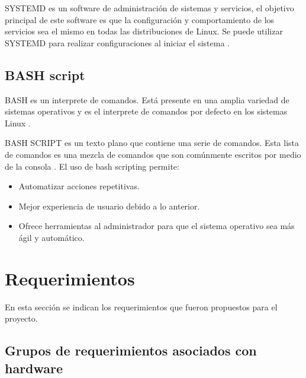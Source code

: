 SYSTEMD es un software de administración de sistemas y servicios, el objetivo principal de este software es que la configuración y comportamiento de los servicios sea el mismo en todas las distribuciones de Linux. Se puede utilizar SYSTEMD para realizar configuraciones al iniciar el sistema \citep{REFSYSTEMD}.

\subsection{BASH script}
BASH es un interprete de comandos. Está presente en una amplia variedad de sistemas operativos y es el interprete de comandos por defecto en los sistemas Linux \citep{BASH}. 


BASH SCRIPT es un texto plano que contiene una serie de comandos. Esta lista de comandos es una mezcla de comandos que son comúnmente escritos por medio de la consola \citep{BASHSCRIPT}. El uso de bash scripting permite:

\begin{itemize}
\item Automatizar acciones repetitivas.
\item Mejor experiencia de usuario debido a lo anterior.
\item Ofrece herramientas al administrador para que el sistema operativo sea más ágil y automático.
\end{itemize}

\section{Requerimientos}
En esta sección se indican los requerimientos que fueron propuestos para el proyecto.

\subsection{Grupos de requerimientos asociados con hardware}

